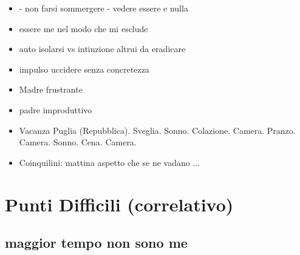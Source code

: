 \begin{itemize}
\item {} - non farsi sommergere - vedere essere e nulla

\item essere me nel modo che mi esclude

\item auto isolarsi vs intinzione altrui da eradicare

\item impulso uccidere senza concretezza

\item Madre frustrante

\item padre improduttivo

\item Vacanza Puglia (Repubblica). Sveglia. Sonno. Colazione. Camera. Pranzo. Camera. Sonno. Cena. Camera.

\item Coinquilini: mattina aspetto che se ne vadano ...

\end{itemize}

\section{Punti Difficili (correlativo)}

\subsection{maggior tempo non sono me}

